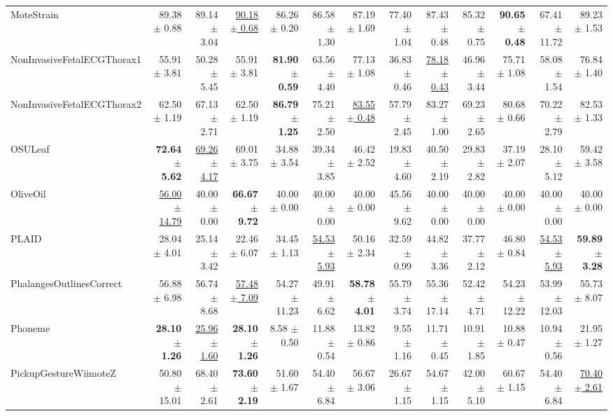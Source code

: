 \begin{landscape}
\begin{longtable}{lrrrrrrrrrrrr}
MoteStrain & 89.38 $\pm$ 0.88 & 89.14 $\pm$ 3.04 & \underline{90.18 $\pm$ 0.68} & 86.26 $\pm$ 0.20 & 86.58 $\pm$ 1.30 & 87.19 $\pm$ 1.69 & 77.40 $\pm$ 1.04 & 87.43 $\pm$ 0.48 & 85.32 $\pm$ 0.75 & \textbf{90.65 $\pm$ 0.48} & 67.41 $\pm$ 11.72 & 89.23 $\pm$ 1.53 \\
NonInvasiveFetalECGThorax1 & 55.91 $\pm$ 3.81 & 50.28 $\pm$ 5.45 & 55.91 $\pm$ 3.81 & \textbf{81.90 $\pm$ 0.59} & 63.56 $\pm$ 4.40 & 77.13 $\pm$ 1.08 & 36.83 $\pm$ 0.46 & \underline{78.18 $\pm$ 0.43} & 46.96 $\pm$ 3.44 & 75.71 $\pm$ 1.08 & 58.08 $\pm$ 1.54 & 76.84 $\pm$ 1.40 \\
NonInvasiveFetalECGThorax2 & 62.50 $\pm$ 1.19 & 67.13 $\pm$ 2.71 & 62.50 $\pm$ 1.19 & \textbf{86.79 $\pm$ 1.25} & 75.21 $\pm$ 2.50 & \underline{83.55 $\pm$ 0.48} & 57.79 $\pm$ 2.45 & 83.27 $\pm$ 1.00 & 69.23 $\pm$ 2.65 & 80.68 $\pm$ 0.66 & 70.22 $\pm$ 2.79 & 82.53 $\pm$ 1.33 \\
OSULeaf & \textbf{72.64 $\pm$ 5.62} & \underline{69.26 $\pm$ 4.17} & 69.01 $\pm$ 3.75 & 34.88 $\pm$ 3.54 & 39.34 $\pm$ 3.85 & 46.42 $\pm$ 2.52 & 19.83 $\pm$ 4.60 & 40.50 $\pm$ 2.19 & 29.83 $\pm$ 2.82 & 37.19 $\pm$ 2.07 & 28.10 $\pm$ 5.12 & 59.42 $\pm$ 3.58 \\
OliveOil & \underline{56.00 $\pm$ 14.79} & 40.00 $\pm$ 0.00 & \textbf{66.67 $\pm$ 9.72} & 40.00 $\pm$ 0.00 & 40.00 $\pm$ 0.00 & 40.00 $\pm$ 0.00 & 45.56 $\pm$ 9.62 & 40.00 $\pm$ 0.00 & 40.00 $\pm$ 0.00 & 40.00 $\pm$ 0.00 & 40.00 $\pm$ 0.00 & 40.00 $\pm$ 0.00 \\
PLAID & 28.04 $\pm$ 4.01 & 25.14 $\pm$ 3.42 & 22.46 $\pm$ 6.07 & 34.45 $\pm$ 1.13 & \underline{54.53 $\pm$ 5.93} & 50.16 $\pm$ 2.34 & 32.59 $\pm$ 0.99 & 44.82 $\pm$ 3.36 & 37.77 $\pm$ 2.12 & 46.80 $\pm$ 0.84 & \underline{54.53 $\pm$ 5.93} & \textbf{59.89 $\pm$ 3.28} \\
PhalangesOutlinesCorrect & 56.88 $\pm$ 6.98 & 56.74 $\pm$ 8.68 & \underline{57.48 $\pm$ 7.09} & 54.27 $\pm$ 11.23 & 49.91 $\pm$ 6.62 & \textbf{58.78 $\pm$ 4.01} & 55.79 $\pm$ 3.74 & 55.36 $\pm$ 17.14 & 52.42 $\pm$ 4.71 & 54.23 $\pm$ 12.22 & 53.99 $\pm$ 12.03 & 55.73 $\pm$ 8.07 \\
Phoneme & \textbf{28.10 $\pm$ 1.26} & \underline{25.96 $\pm$ 1.60} & \textbf{28.10 $\pm$ 1.26} & 8.58 $\pm$ 0.50 & 11.88 $\pm$ 0.54 & 13.82 $\pm$ 0.86 & 9.55 $\pm$ 1.16 & 11.71 $\pm$ 0.45 & 10.91 $\pm$ 1.85 & 10.88 $\pm$ 0.47 & 10.94 $\pm$ 0.56 & 21.95 $\pm$ 1.27 \\
PickupGestureWiimoteZ & 50.80 $\pm$ 15.01 & 68.40 $\pm$ 2.61 & \textbf{73.60 $\pm$ 2.19} & 51.60 $\pm$ 1.67 & 54.40 $\pm$ 6.84 & 56.67 $\pm$ 3.06 & 26.67 $\pm$ 1.15 & 54.67 $\pm$ 1.15 & 42.00 $\pm$ 5.10 & 60.67 $\pm$ 1.15 & 54.40 $\pm$ 6.84 & \underline{70.40 $\pm$ 2.61} \\

\end{longtable}
\end{landscape}
